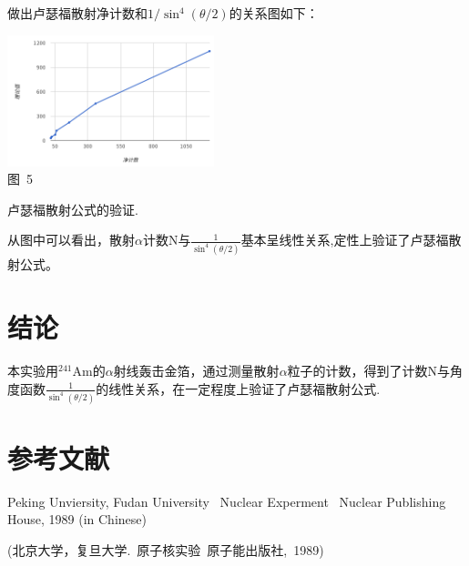 \documentclass[a4paper,10.0pt,twoside]{npr}
\begin{document}
\begin{multicols}{2}
做出卢瑟福散射净计数和$1/\sin^4(\theta/2)$的关系图如下：

\begin{center}
   \includegraphics[width=0.45\textwidth]{3.png}
\\
\xiaowu\song 图~5\begin{minipage}[t]{75mm} \quad 卢瑟福散射公式的验证.\\[-1mm]\wuhao
\end{minipage}
\end{center}

从图中可以看出，散射$\alpha$计数N与$\frac{1}{\sin^4(\theta/2)}$基本呈线性关系,定性上验证了卢瑟福散射公式。

\section{结论}

本实验用$^{241}$Am的$\alpha$射线轰击金箔，通过测量散射$\alpha$粒子的计数，得到了计数N与角度函数$\frac{1}{\sin^4(\theta/2)}$的线性关系，在一定程度上验证了卢瑟福散射公式. 

\section{参考文献}

\noindent
[1] Peking Unviersity, Fudan University \ Nuclear Experment
\ Nuclear Publishing House, 1989 (in Chinese)

\noindent
 (北京大学，复旦大学.\ 原子核实验\ 原子能出版社,\ 1989)

\end{multicols}

\newpage

\clearpage
\end{document}

